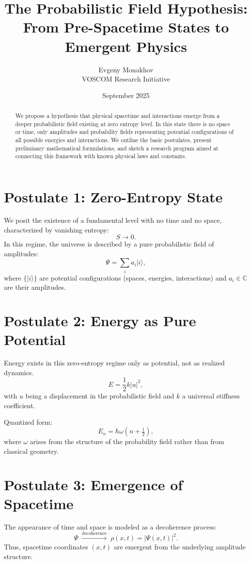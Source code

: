 \documentclass[12pt,a4paper]{article}
\title{The Probabilistic Field Hypothesis: \\
From Pre-Spacetime States to Emergent Physics}
\author{Evgeny Monakhov \\ VOSCOM Research Initiative}
\date{September 2025}
\begin{document}
\maketitle

\begin{abstract}
We propose a hypothesis that physical spacetime and interactions emerge from a deeper probabilistic field existing at zero entropy level. In this state there is no space or time, only amplitudes and probability fields representing potential configurations of all possible energies and interactions. We outline the basic postulates, present preliminary mathematical formulations, and sketch a research program aimed at connecting this framework with known physical laws and constants.
\end{abstract}

\section{Postulate 1: Zero-Entropy State}
We posit the existence of a fundamental level with no time and no space, characterized by vanishing entropy:
\[
S \to 0.
\]
In this regime, the universe is described by a pure probabilistic field of amplitudes:
\[
\Psi = \sum_{i} a_i |i\rangle ,
\]
where $\{|i\rangle\}$ are potential configurations (spaces, energies, interactions) and $a_i \in \mathbb{C}$ are their amplitudes.

\section{Postulate 2: Energy as Pure Potential}
Energy exists in this zero-entropy regime only as potential, not as realized dynamics. 
\[
E = \frac{1}{2}k |u|^2 ,
\]
with $u$ being a displacement in the probabilistic field and $k$ a universal stiffness coefficient.

Quantized form:
\[
E_n = \hbar \omega \left(n + \tfrac{1}{2}\right),
\]
where $\omega$ arises from the structure of the probability field rather than from classical geometry.

\section{Postulate 3: Emergence of Spacetime}
The appearance of time and space is modeled as a decoherence process:
\[
\Psi \;\xrightarrow{\text{decoherence}}\; \rho(x,t) = |\Psi(x,t)|^2 .
\]
Thus, spacetime coordinates $(x,t)$ are emergent from the underlying amplitude structure.
\end{document}
